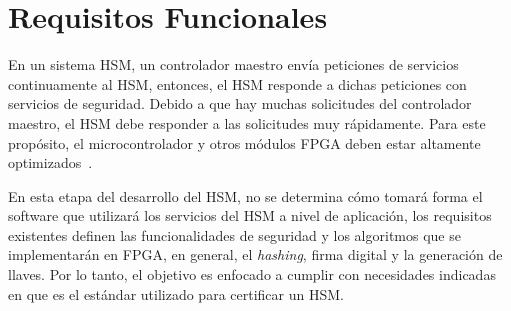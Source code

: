 \documentclass[a4paper]{article}
\begin{document}
  \section{Requisitos Funcionales}
    
En un sistema HSM, un controlador maestro envía peticiones de servicios continuamente al HSM, entonces, el HSM responde a dichas peticiones con servicios de seguridad. Debido a que hay muchas solicitudes del controlador maestro, el HSM debe responder a las solicitudes muy rápidamente. Para este propósito, el microcontrolador y otros módulos FPGA deben estar altamente optimizados~\cite{evita-hsm:2012}. 

En esta etapa del desarrollo del HSM, no se determina cómo tomará forma el software que utilizará los servicios del HSM a nivel de aplicación, los requisitos existentes definen las funcionalidades de seguridad y los algoritmos que se implementarán en FPGA, en general, el \textit{hashing}, firma digital y la generación de llaves. Por lo tanto, el objetivo es enfocado a cumplir con necesidades indicadas en \cite{std-fips-140-2:2005} que es el estándar utilizado para certificar un HSM.
\end{document}
